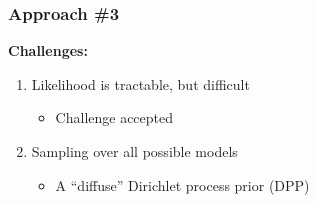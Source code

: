 \begin{frame}[t]
    \frametitle{Approach \#3}

    \textbf{Challenges:} \\
    \begin{minipage}[t][0.35\textheight][t]{\linewidth}
    \begin{enumerate}
        \item<1-> Likelihood is tractable, but difficult
        \begin{itemize}
            \item<2-> Challenge accepted
        \end{itemize}
    \end{enumerate}
    \end{minipage}

    \begin{minipage}[t][0.35\textheight][t]{\linewidth}
    \begin{enumerate}
        \setcounter{enumi}{1}
        \item<1-> Sampling over all possible models
        \begin{itemize}
            \item<1-> A ``diffuse'' Dirichlet process prior (DPP)
        \end{itemize}
    \end{enumerate}
    \end{minipage}
\end{frame}
